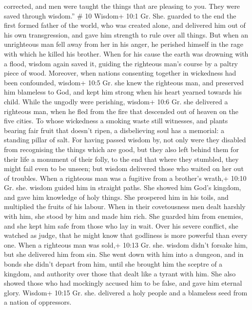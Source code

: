 corrected, and men were taught the things that are pleasing to you. They
were saved through wisdom.'' \# 10  Wisdom+ 10:1 Gr. She.
guarded to the end the first formed father of the world, who was created
alone, and delivered him out of his own transgression,  and
gave him strength to rule over all things.  But when an
unrighteous man fell away from her in his anger, he perished himself in
the rage with which he killed his brother.  When for his
cause the earth was drowning with a flood, wisdom again saved it,
guiding the righteous man's course by a paltry piece of wood.
 Moreover, when nations consenting together in wickedness
had been confounded, wisdom+ 10:5 Gr. she knew the righteous man, and
preserved him blameless to God, and kept him strong when his heart
yearned towards his child.  While the ungodly were
perishing, wisdom+ 10:6 Gr. she delivered a righteous man, when he fled
from the fire that descended out of heaven on the five cities.
 To whose wickedness a smoking waste still witnesses, and
plants bearing fair fruit that doesn't ripen, a disbelieving soul has a
memorial: a standing pillar of salt.  For having passed
wisdom by, not only were they disabled from recognising the things which
are good, but they also left behind them for their life a monument of
their folly, to the end that where they stumbled, they might fail even
to be unseen;  but wisdom delivered those who waited on her
out of troubles.  When a righteous man was a fugitive from
a brother's wrath,+ 10:10 Gr. she. wisdom guided him in straight paths.
She showed him God's kingdom, and gave him knowledge of holy things. She
prospered him in his toils, and multiplied the fruits of his labour.
 When in their covetousness men dealt harshly with him, she
stood by him and made him rich.  She guarded him from
enemies, and she kept him safe from those who lay in wait. Over his
severe conflict, she watched as judge, that he might know that godliness
is more powerful than every one.  When a righteous man was
sold,+ 10:13 Gr. she. wisdom didn't forsake him, but she delivered him
from sin. She went down with him into a dungeon,  and in
bonds she didn't depart from him, until she brought him the sceptre of a
kingdom, and authority over those that dealt like a tyrant with him. She
also showed those who had mockingly accused him to be false, and gave
him eternal glory.  Wisdom+ 10:15 Gr. she. delivered a holy
people and a blameless seed from a nation of oppressors. 
